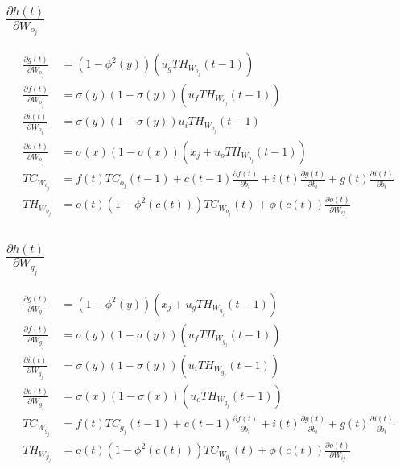 \documentclass{article}
\begin{document}
\subsection{$\frac{\partial h(t)}{\partial W_{o_j}}$}

\begin{equation}
\begin{aligned}
\frac{\partial g(t)}{\partial W_{o_j}} &=  (1-\phi^2(y))(u_g TH_{W_{o_j}}(t-1))  \\
\frac{\partial f(t)}{\partial W_{o_j}} &=  \sigma(y)(1-\sigma(y))( u_f TH_{W_{o_j}}(t-1)) \\
\frac{\partial i(t)}{\partial W_{o_j}}  &= \sigma(y)(1-\sigma(y)) u_i TH_{W_{o_j}}(t-1)  \\
\frac{\partial o(t)}{\partial W_{o_j}} &=  \sigma(x)(1-\sigma(x))(x_j + u_o TH_{W_{o_j}}(t-1))  \\
TC_{W_{o_j}}&= f(t) TC_{o_j}(t-1) + c(t-1)\frac{\partial f(t)}{ \partial b_i} + i(t)\frac{\partial g(t) }{\partial b_i}  + g(t)\frac{\partial i(t) }{\partial b_i}  \\
TH_{W_{o_j}}&= o(t) (1-\phi^{2}(c(t))) TC_{W_{o_j}}(t)  + \phi(c(t)) \frac{\partial o(t)}{\partial W_{ij}}  
\end{aligned}
\end{equation}


\subsection{$\frac{\partial h(t)}{\partial W_{g_j}}$}

\begin{equation}
\begin{aligned}
\frac{\partial g(t)}{\partial W_{g_j}} &=  (1-\phi^2(y))(x_j + u_g TH_{W_{g_j}}(t-1))  \\
\frac{\partial f(t)}{\partial W_{g_j}} &=  \sigma(y)(1-\sigma(y))( u_f TH_{W_{g_j}}(t-1)) \\
\frac{\partial i(t)}{\partial W_{g_j}}  &= \sigma(y)(1-\sigma(y))(u_i TH_{W_{g_j}}(t-1))  \\
\frac{\partial o(t)}{\partial W_{g_j}} &=  \sigma(x)(1-\sigma(x))( u_o TH_{W_{g_j}}(t-1))  \\
TC_{W_{g_j}}&= f(t) TC_{g_j}(t-1) + c(t-1)\frac{\partial f(t)}{ \partial b_i} + i(t)\frac{\partial g(t) }{\partial b_i}  + g(t)\frac{\partial i(t) }{\partial b_i}  \\
TH_{W_{g_j}}&= o(t) (1-\phi^{2}(c(t))) TC_{W_{g_j}}(t)  + \phi(c(t)) \frac{\partial o(t)}{\partial W_{ij}}  
\end{aligned}
\end{equation}
\end{document}
